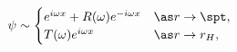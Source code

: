 \begin{equation}
\psi \sim
\begin{cases}
e^{i \omega x} + R(\omega) e^{-i \omega x} & \as r \to \spt, \label{imaginary-transmission-boundary} \\
T(\omega) e^{i \omega x} & \as r \to r_H,
\end{cases}
\end{equation}

